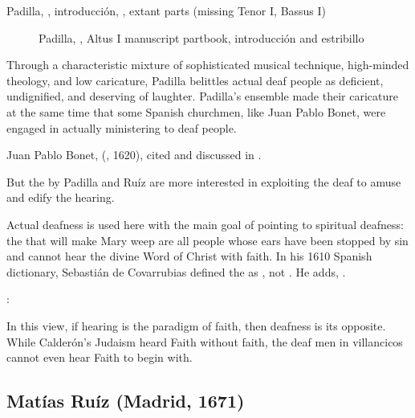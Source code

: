 \begin{exmusic}
  \caption{Padilla, , introducción, , extant parts (missing Tenor I, Bassus I)}
  \label{exmusic:Padilla-Sordo-intro}
\end{exmusic}
\begin{figure}
  \caption{Padilla, , Altus I manuscript partbook, introducción and estribillo}
  \label{figure:Padilla-Sordo-MS-estribillo}
\end{figure}

Through a characteristic mixture of sophisticated musical technique, high-minded theology, and low caricature, Padilla belittles actual deaf people as deficient, undignified, and deserving of laughter.
Padilla's ensemble made their caricature at the same time that some Spanish churchmen, like Juan Pablo Bonet, were engaged in actually ministering to deaf people.%
\begin{Footnote}
  Juan Pablo Bonet,  (\XXX, 1620), cited and discussed in \autocite{Plann:DeafEducationSpain}.
\end{Footnote}
But the  by Padilla and Ruíz are more interested in exploiting the deaf to amuse and edify the hearing.

Actual deafness is used here with the main goal of pointing to spiritual deafness: the  that will make Mary weep are all people whose ears have been stopped by sin and cannot hear the divine Word of Christ with faith.
In his 1610 Spanish dictionary, Sebastián de Covarrubias defined the  as , not .
He adds, .%
\begin{Footnote}
  \autocite[]{Covarrubias:Tesoro}:
\end{Footnote}
In this view, if hearing is the paradigm of faith, then deafness is its opposite.
While Calderón's Judaism heard Faith without faith, the deaf men in villancicos cannot even hear Faith to begin with.

\subsection{Matías Ruíz (Madrid, 1671)}

